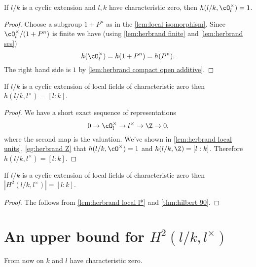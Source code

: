 \begin{lemma}\label{lem:herbrand local units}
	If $l/k$ is a cyclic extension and $l,k$ have characteristic zero,
	then $h(l/k, \cO_l^\times) = 1$.
\end{lemma}

\begin{proof}
	Choose a subgroup $1+P^n$ as in the \ref{lem:local isomorphism}.
	Since $\cO_l^\times / (1+P^n)$ is finite we have
	(using \ref{lem:herbrand finite} and \ref{lem:herbrand ses})
	\[
		h(\cO_l^\times) = h(1+P^n) = h(P^n).
	\]
	The right hand side is $1$ by \ref{lem:herbrand compact open additive}.
\end{proof}

\begin{lemma} \label{lem:herbrand local l*}
	If $l/k$ is a cyclic extension of local fields of characteristic zero
	then $h(l/k, l^\times)= [l:k]$.
\end{lemma}

\begin{proof}
	We have a short exact sequence of representations
	\[
		0 \to \cO_l^\times \to l^\times \to \Z \to 0,
 	\]
	where the second map is the valuation.
	We've shown in \ref{lem:herbrand local units}, \ref{eg:herbrand Z}
	that $h(l/k,\cO^\times)=1$ and $h(l/k,\Z) = [l:k]$.
	Therefore $h(l/k,l^\times) = [l:k]$.
\end{proof}


\begin{lemma} \label{lem:local H2 l*}
	If $l/k$ is a cyclic extension of local fields of characteristic zero
	then $|H^2(l/k,l^\times)| = [l:k]$.
\end{lemma}

\begin{proof}
	The follows from \ref{lem:herbrand local l*} and \ref{thm:hilbert 90}.
\end{proof}




\section{An upper bound for \texorpdfstring{$H^2(l/k,l^\times)$}{H2(l/k,l*)}}

From now on $k$ and $l$ have characteristic zero.

